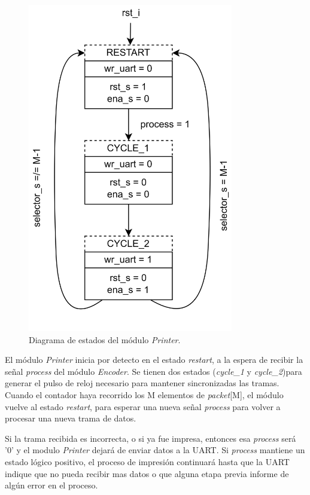 	\begin{figure}[H]
		\centering
		\includegraphics[width=0.8\textwidth]{Figuras/Printer_FSMD.png}
		\centering\caption{Diagrama de estados del módulo \textit{Printer}.}
		\label{fig:Printer_FSMD}
	\end{figure}
	
	El módulo \textit{Printer} inicia por detecto en el estado \textit{restart}, a la espera de recibir la señal \textit{process} del módulo \textit{Encoder}. Se tienen dos estados (\textit{cycle\_1} y \textit{cycle\_2})para generar el pulso de reloj necesario para mantener sincronizadas las tramas. Cuando el contador haya recorrido los M elementos de \textit{packet}[M], el módulo vuelve al estado \textit{restart}, para esperar una nueva señal \textit{process} para volver a procesar una nueva trama de datos.
	
	Si la trama recibida es incorrecta, o si ya fue impresa, entonces esa \textit{process} será '0' y el modulo \textit{Printer} dejará de enviar datos a la UART. Si \textit{process} mantiene un estado lógico positivo, el proceso de impresión continuará hasta que la UART indique que no pueda recibir mas datos o que alguna etapa previa informe de algún error en el proceso.